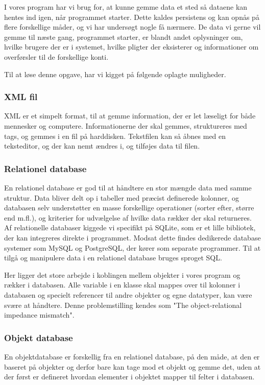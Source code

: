 I vores program har vi brug for, at kunne gemme data et sted så dataene kan hentes ind igen, når programmet starter. Dette kaldes persistens og kan opnås på flere forskellige måder, og vi har undersøgt nogle få nærmere.
De data vi gerne vil gemme til næste gang, programmet starter, er blandt andet oplysninger om, hvilke brugere der er i systemet, hvilke pligter der eksisterer og informationer om overførsler til de forskellige konti. 

Til at løse denne opgave, har vi kigget på følgende oplagte muligheder.

\subsubsection{XML fil}
XML er et simpelt format, til at gemme information, der er let læseligt for både mennesker og computere. Informationerne der skal gemmes, struktureres med tags, og gemmes i en fil på harddisken\cite{xmlspecs}. Tekstfilen kan så åbnes med en teksteditor, og der kan nemt ændres i, og tilføjes data til filen.


\subsubsection{Relationel database}
En relationel database er god til at håndtere en stor mængde data med samme struktur. Data bliver delt op i tabeller med præcist definerede kolonner, og databasen selv understøtter en masse forskellige operationer (sorter efter, større end m.fl.), og kriterier for udvælgelse af hvilke data rækker der skal returneres. Af relationelle databaser kiggede vi specifikt på SQLite, som er et lille bibliotek, der kan integreres direkte i programmet. Modsat dette findes dedikerede database systemer som MySQL og PostgreSQL, der kører som separate programmer. Til at tilgå og manipulere data i en relationel database bruges sproget SQL.

Her ligger det store arbejde i koblingen mellem objekter i vores program og rækker i databasen. Alle variable i en klasse skal mappes over til kolonner i databasen og specielt referencer til andre objekter og egne datatyper, kan være svære at håndtere. Denne problemstilling kendes som "The object-relational impedance mismatch"\cite{ORIM}.

\subsubsection{Objekt database}
En objektdatabase er forskellig fra en relationel database, på den måde, at den er baseret på objekter og derfor bare kan tage mod et objekt og gemme det, uden at der først er defineret hvordan elementer i objektet mapper til felter i databasen.
\\

